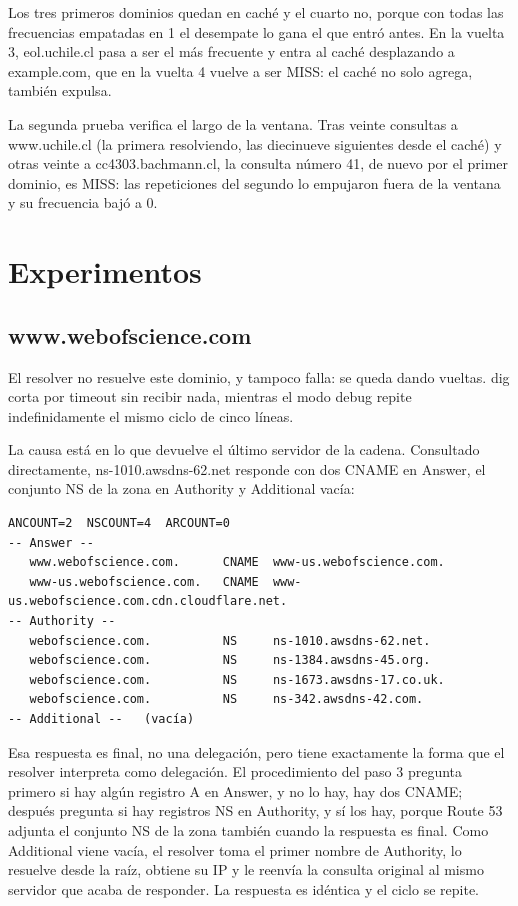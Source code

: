 \documentclass[
	spanish, %
	letterpaper, oneside
]{article}
\begin{document}
Los tres primeros dominios quedan en caché y el cuarto no, porque con todas las frecuencias empatadas en 1 el desempate lo gana el que entró antes. En la vuelta 3, eol.uchile.cl pasa a ser el más frecuente y entra al caché desplazando a example.com, que en la vuelta 4 vuelve a ser MISS: el caché no solo agrega, también expulsa.

La segunda prueba verifica el largo de la ventana. Tras veinte consultas a www.uchile.cl (la primera resolviendo, las diecinueve siguientes desde el caché) y otras veinte a cc4303.bachmann.cl, la consulta número 41, de nuevo por el primer dominio, es MISS: las repeticiones del segundo lo empujaron fuera de la ventana y su frecuencia bajó a 0.

\section{Experimentos}

\subsection{www.webofscience.com}
El resolver no resuelve este dominio, y tampoco falla: se queda dando vueltas. dig corta por timeout sin recibir nada, mientras el modo debug repite indefinidamente el mismo ciclo de cinco líneas.

La causa está en lo que devuelve el último servidor de la cadena. Consultado directamente, ns-1010.awsdns-62.net responde con dos CNAME en Answer, el conjunto NS de la zona en Authority y Additional vacía:

{\scriptsize
\begin{verbatim}
ANCOUNT=2  NSCOUNT=4  ARCOUNT=0
-- Answer --
   www.webofscience.com.      CNAME  www-us.webofscience.com.
   www-us.webofscience.com.   CNAME  www-us.webofscience.com.cdn.cloudflare.net.
-- Authority --
   webofscience.com.          NS     ns-1010.awsdns-62.net.
   webofscience.com.          NS     ns-1384.awsdns-45.org.
   webofscience.com.          NS     ns-1673.awsdns-17.co.uk.
   webofscience.com.          NS     ns-342.awsdns-42.com.
-- Additional --   (vacía)
\end{verbatim}
}

Esa respuesta es final, no una delegación, pero tiene exactamente la forma que el resolver interpreta como delegación. El procedimiento del paso 3 pregunta primero si hay algún registro A en Answer, y no lo hay, hay dos CNAME; después pregunta si hay registros NS en Authority, y sí los hay, porque Route 53 adjunta el conjunto NS de la zona también cuando la respuesta es final. Como Additional viene vacía, el resolver toma el primer nombre de Authority, lo resuelve desde la raíz, obtiene su IP y le reenvía la consulta original al mismo servidor que acaba de responder. La respuesta es idéntica y el ciclo se repite.
\end{document}
